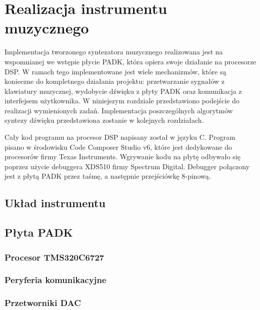 \chapter{Realizacja instrumentu muzycznego}
Implementacja tworzonego syntezatora muzycznego realizowana jest na wspomnianej we wstępie płycie PADK, która opiera swoje działanie na procesorze DSP. W ramach tego implementowane jest wiele mechanizmów, które są konieczne do kompletnego działania projektu: przetwarzanie sygnałów z klawiatury muzycznej, wydobycie dźwięku z płyty PADK oraz komunikacja z interfejsem użytkownika. W niniejszym rozdziale przedstawiono podejście do realizacji wymienionych zadań. Implementacja poszczególnych algorytmów syntezy dźwięku przedstawiona zostanie w kolejnych rozdziałach.

Cały kod programu na procesor DSP napisany został w języku C. Program pisano w środowisku Code Composer Studio v6, które jest dedykowane do procesorów firmy Texas Instruments. Wgrywanie kodu na płytę odbywało się poprzez użycie debuggera XDS510 firmy Spectrum Digital. Debugger połączony jest z płytą PADK przez taśmę, a następnie przejściówkę 8-pinową.


\section{Układ instrumentu}

\section{Płyta PADK}

\subsection{Procesor TMS320C6727}

\subsection{Peryferia komunikacyjne}

\subsection{Przetworniki DAC}



